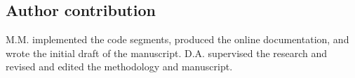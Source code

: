 \documentclass[pdflatex,sn-basic]{sn-jnl}
\begin{document}
\subsection*{Author contribution}
M.M. implemented the code segments, produced the online documentation, and wrote the initial draft of the manuscript. D.A. supervised the research and revised and edited the methodology and manuscript.
 
 

 


\end{document}
